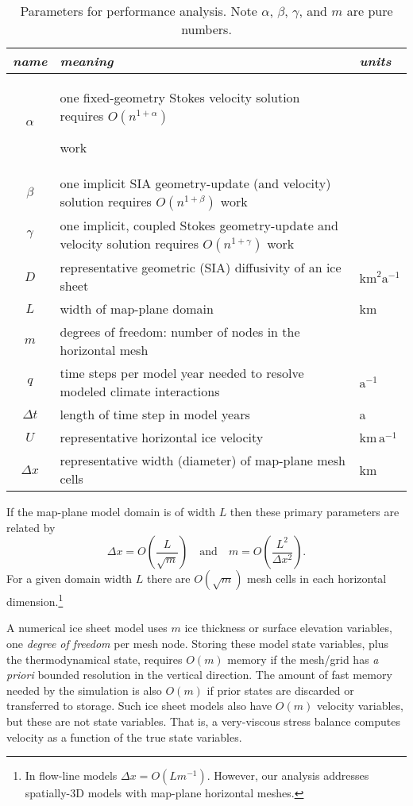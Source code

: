 \documentclass[review,letterpaper]{igs}
\begin{document}
\begin{table*}[ht]
{\normalsize
\begin{tabular}{cll}
\emph{name} & \emph{meaning} & \emph{units} \\ \hline
$\alpha$    & one fixed-geometry Stokes velocity solution requires $O(n^{1+\alpha})${\large \strut} work\\
$\beta$     & one implicit SIA geometry-update (and velocity) solution requires $O(n^{1+\beta})$ work \\
$\gamma$    & one implicit, coupled Stokes geometry-update and velocity solution requires $O(n^{1+\gamma})$ work \\
$D$         & representative geometric (SIA) diffusivity of an ice sheet & $\text{km}^2 \text{a}^{-1}$ \\
$L$         & width of map-plane domain & km \\
$m$         & degrees of freedom: number of nodes in the horizontal mesh \\
$q$         & time steps per model year needed to resolve modeled climate interactions & $\text{a}^{-1}$ \\
$\Delta t$  & length of time step in model years & a \\
$U$         & representative horizontal ice velocity & $\text{km}\,\text{a}^{-1}$ \\
$\Delta x$  & representative width (diameter) of map-plane mesh cells & km
\end{tabular}
}
\caption{Parameters for performance analysis.  Note $\alpha$, $\beta$, $\gamma$, and $m$ are pure numbers.}
\label{tab:notation}
\end{table*}

If the map-plane model domain is of width $L$ then these primary parameters are related by
\begin{equation}
\Delta x = O\left(\frac{L}{\sqrt{m}}\right) \quad \text{and} \quad m = O\left(\frac{L^2}{\Delta x^2}\right).  \label{eq:paramrelation}
\end{equation}
For a given domain width $L$ there are $O(\sqrt{m})$ mesh cells in each horizontal dimension.\footnote{In flow-line models $\Delta x = O(L m^{-1})$.  However, our analysis addresses spatially-3D models with map-plane horizontal meshes.}

A numerical ice sheet model uses $m$ ice thickness or surface elevation variables, one \emph{degree of freedom} per mesh node.  Storing these model state variables, plus the thermodynamical state, requires $O(m)$ memory if the mesh/grid has \emph{a priori} bounded resolution in the vertical direction.  The amount of fast memory needed by the simulation is also $O(m)$ if prior states are discarded or transferred to storage.  Such ice sheet models also have $O(m)$ velocity variables, but these are not state variables.  That is, a very-viscous stress balance computes velocity as a function of the true state variables.
\end{document}
